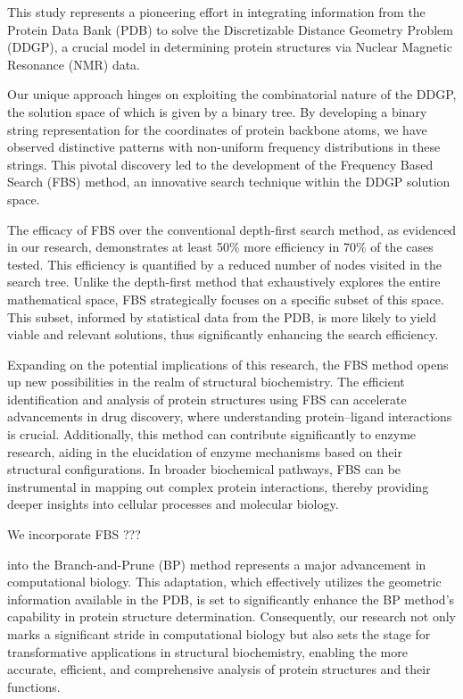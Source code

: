 \documentclass[journal=jacsat,manuscript=article]{achemso}
\begin{document}
{This study represents a pioneering effort in integrating information from the Protein Data Bank (PDB) to solve the Discretizable Distance Geometry Problem (DDGP), a crucial model in determining protein structures via Nuclear Magnetic Resonance (NMR) data. }

{Our unique approach hinges on exploiting the combinatorial nature of the DDGP, the solution space of which is given by a binary tree. By developing a binary string representation for the coordinates of protein backbone atoms, we have observed distinctive patterns with non-uniform frequency distributions in these strings. This pivotal discovery led to the development of the Frequency Based Search (FBS) method, an innovative search technique within the DDGP solution space.}

{The efficacy of FBS over the conventional depth-first search method, as evidenced in our research, demonstrates at least 50\% more efficiency in 70\% of the cases tested. This efficiency is quantified by a reduced number of nodes visited in the search tree. Unlike the depth-first method that exhaustively explores the entire mathematical space, FBS strategically focuses on a specific subset of this space. This subset, informed by statistical data from the PDB, is more likely to yield viable and relevant solutions, thus significantly enhancing the search efficiency.}

{Expanding on the potential implications of this research, the FBS method opens up new possibilities in the realm of structural biochemistry. The efficient identification and analysis of protein structures using FBS can accelerate advancements in drug discovery, where understanding protein--ligand interactions is crucial. Additionally, this method can contribute significantly to enzyme research, aiding in the elucidation of enzyme mechanisms based on their structural configurations. In broader biochemical pathways, FBS can be instrumental in mapping out complex protein interactions, thereby providing deeper insights into cellular processes and molecular biology.}

{\color{red}

We incorporate FBS ???} into the Branch-and-Prune (BP) method represents a major advancement in computational biology. This adaptation, which effectively utilizes the geometric information available in the PDB, is set to significantly enhance the BP method's capability in protein structure determination. Consequently, our research not only marks a significant stride in computational biology but also sets the stage for transformative applications in structural biochemistry, enabling the more accurate, efficient, and comprehensive analysis of protein structures and their functions.
\end{document}
